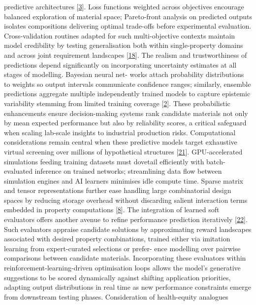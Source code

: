 \documentclass[
]{article}
\begin{document}
predictive architectures {[}\hyperref[_bookmark43]{3}{]}. Loss functions
weighted across objectives encourage balanced exploration of material
space; Pareto-front analysis on predicted outputs isolates compositions
delivering optimal trade-offs before experimental evaluation.
Cross-validation routines adapted for such multi-objective contexts
maintain model credibility by testing generalisation both within
single-property domains and across joint requirement landscapes
{[}\hyperref[_bookmark58]{18}{]}. The realism and trustworthiness of
predictions depend significantly on incorporating uncertainty estimates
at all stages of modelling. Bayesian neural net- works attach
probability distributions to weights so output intervals communicate
confidence ranges; similarly, ensemble predictions aggregate multiple
independently trained models to capture epistemic variability stemming
from limited training coverage {[}\hyperref[_bookmark42]{2}{]}. These
probabilistic enhancements ensure decision-making systems rank candidate
materials not only by mean expected performance but also by reliability
scores, a critical safeguard when scaling lab-scale insights to
industrial production risks. Computational considerations remain central
when these predictive models target exhaustive virtual screening over
millions of hypothetical structures {[}\hyperref[_bookmark61]{21}{]}.
GPU-accelerated simulations feeding training datasets must dovetail
efficiently with batch-evaluated inference on trained networks;
streamlining data flow between simulation engines and AI learners
minimises idle compute time. Sparse matrix and tensor representations
further ease handling large combinatorial design spaces by reducing
storage overhead without discarding salient interaction terms embedded
in property computations {[}\hyperref[_bookmark48]{8}{]}. The
integration of learned soft evaluators offers another avenue to refine
performance prediction iteratively {[}\hyperref[_bookmark62]{22}{]}.
Such evaluators appraise candidate solutions by approximating reward
landscapes associated with desired property combinations, trained either
via imitation learning from expert-curated selections or prefer- ence
modelling over pairwise comparisons between candidate materials.
Incorporating these evaluators within reinforcement-learning-driven
optimisation loops allows the model's generative suggestions to be
scored dynamically against shifting application priorities, adapting
output distributions in real time as new performance constraints emerge
from downstream testing phases. Consideration of health-equity analogues
\end{document}
